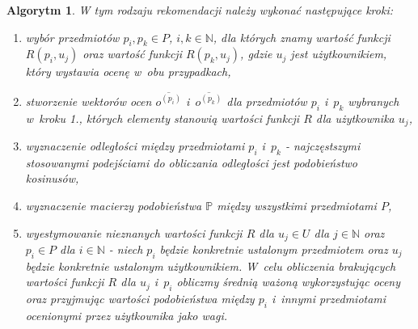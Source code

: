 \documentclass[12pt,a4paper]{report}
\newtheorem{algorytm}[df]{Algorytm}
\newcommand{\setN}{\mathbb{N}}
\newcommand{\setUzytkownicy}{\mathit{U}}
\newcommand{\setPrzedmioty}{\mathit{P}}
\begin{document}
\begin{algorytm}
W tym rodzaju rekomendacji należy wykonać następujące kroki:
\begin{enumerate}
\item wybór przedmiotów $p_i, p_k \in \setPrzedmioty$, $i,k \in \setN$, dla których znamy wartość funkcji $R(p_i,u_j)$ oraz wartość funkcji $R(p_k,u_j)$, gdzie $u_j$ jest użytkownikiem, który wystawia ocenę w~obu przypadkach,
\item stworzenie wektorów ocen $\overline{o^{(p_i)}}$ i~$\overline{o^{(p_k)}}$ dla przedmiotów $p_i$ i~$p_k$ wybranych w~kroku 1., których elementy stanowią wartości funkcji $R$ dla użytkownika $u_j$,
\item wyznaczenie odległości między przedmiotami $p_i$ i~$p_k$ - najczęstszymi stosowanymi podejściami do obliczania odległości jest podobieństwo kosinusów,
\item wyznaczenie macierzy podobieństwa $\mathbb{P}$ między wszystkimi przedmiotami $\setPrzedmioty$,
\item wyestymowanie nieznanych wartości funkcji $R$ dla $u_j \in \setUzytkownicy$ dla $j \in \setN$ oraz $p_i \in \setPrzedmioty$ dla $i \in \setN$  - niech $p_i$ będzie konkretnie ustalonym przedmiotem oraz $u_j$ będzie konkretnie ustalonym użytkownikiem. W~celu obliczenia brakujących wartości funkcji $R$ dla $u_j$ i~$p_i$ obliczmy średnią ważoną wykorzystując oceny oraz przyjmując wartości podobieństwa między $p_i$ i~innymi przedmiotami ocenionymi przez użytkownika jako wagi.
\end{enumerate}
\end{algorytm}
\end{document}
